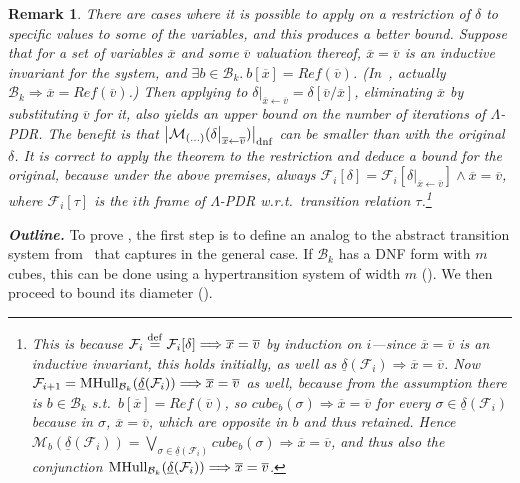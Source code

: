 \documentclass[acmsmall,screen]{acmart}
\newtheorem{remark}[theo]{Remark}
\newcommand{\para}[1]{\vspace{2pt}\noindent\textbf{\textit{#1.}}}
\newcommand{\ov}{\overline}
\newcommand{\card}[1]{{\left\vert{#1}\right\vert}} %
\renewcommand{\implies}{\Longrightarrow}
\newcommand{\tr}{\delta}
\newcommand{\Frame}{\mathcal{F}}
\renewcommand{\vec}{\ov}
\newcommand{\eqdef}{\stackrel{\rm def}{=}}
\newcommand{\reflextr}[1]{\underline{#1}}
\newcommand{\postimage}[2]{{\reflextr{#1}}({#2})}
\newcommand{\bkwrch}[1]{\mathcal{B}_{#1}}
\newcommand{\dnfsize}[1]{\card{#1}_{\rm dnf}}
\newcommand{\cubemon}[2]{\textit{cube}_{{#2}}({#1})}
\newcommand{\monox}[2]{\mathcal{M}_{#2}({#1})}
\newcommand{\mhull}[2]{{\rm MHull}_{#2}({#1})}
\newcommand{\reflect}[1]{\textit{Ref}({#1})}
\newcommand{\restrict}[2]{{#1}\big|_{#2}}
\begin{document}
\begin{remark}
\label{lem:diameter-bound-project-irrelevant}
There are cases where it is possible to apply  on a restriction of $\tr$ to specific values to some of the variables, and this produces a better bound.
%
Suppose that for a set of variables $\vec{x}$ and some $\vec{v}$ valuation thereof, $\vec{x}=\vec{v}$ is an inductive invariant for the system, and $\exists b \in \bkwrch{k}. \ b[\vec{x}]=\reflect{\vec{v}}$. (In~, actually $\bkwrch{k} \implies \vec{x}=\reflect{\vec{v}}$.)
Then applying  to $\restrict{\tr}{\vec{x}\gets\vec{v}}=\tr[\vec{v}/\vec{x}]$, eliminating $\vec{x}$ by substituting $\vec{v}$ for it, also yields an upper bound on the number of iterations of $\Lambda$-PDR. The benefit is that
%
$\dnfsize{\monox{\restrict{\tr}{\vec{x}\gets\vec{v}}}{(\ldots)}}$
can be smaller than with the original $\tr$.
%
It is correct to apply the theorem to the restriction and deduce a bound for the original, because under the above premises, always $\Frame_i[\tr] = \Frame_i[\restrict{\tr}{\vec{x}\gets\vec{v}}] \land \vec{x}=\vec{v}$, where $\Frame_i[\tau]$ is the $i$th frame of $\Lambda$-PDR w.r.t.\ transition relation $\tau$.\footnote{
	This is because $\Frame_i \eqdef \Frame_i[\tr] \implies \vec{x}=\vec{v}$ by induction on $i$---since $\vec{x}=\vec{v}$ is an inductive invariant, this holds initially, as well as $\postimage{\tr}{\Frame_i} \implies \vec{x}=\vec{v}$.
	Now $\Frame_{i+1}=\mhull{\postimage{\tr}{\Frame_i}}{\bkwrch{k}} \implies \vec{x}=\vec{v}$ as well, because from the assumption there is $b \in \bkwrch{k}$ s.t.\ $b[\vec{x}]=\reflect{\vec{v}}$, so $\cubemon{\sigma}{b} \implies \vec{x}=\vec{v}$ for every $\sigma \in \postimage{\tr}{\Frame_i}$ because in $\sigma$, $\vec{x}=\vec{v}$, which are opposite in $b$ and thus retained. Hence $\monox{\postimage{\tr}{\Frame_i}}{b} = \bigvee_{\sigma \in \postimage{\tr}{\Frame_i}}{\cubemon{\sigma}{b}} \implies \vec{x}=\vec{v}$, and thus also the conjunction
	$\mhull{\postimage{\tr}{\Frame_i}}{\bkwrch{k}} \implies \vec{x}=\vec{v}$.
}
%
%
\end{remark}

\para{Outline}
To prove , the first step is to define an analog to the abstract transition system from~ that captures  in the general case.
If $\bkwrch{k}$ has a DNF form with $m$ cubes, this can be done using a hypertransition system of width $m$ (). We then proceed to bound its diameter ().
%
%
%
%
\end{document}
